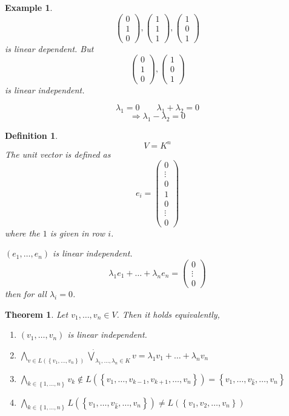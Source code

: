 \documentclass[a4paper,landscape,twocolumn]{article}
\newcommand\set[1]{\left\{#1\right\}}
\newtheorem{theorem}{Theorem}
\newtheorem{defi}{Definition}
\newtheorem{ex}{Example}
\begin{document}
\begin{ex}
  \[ \begin{pmatrix} 0 \\ 1 \\ 0 \end{pmatrix}, \begin{pmatrix} 1 \\ 1 \\ 1 \end{pmatrix}, \begin{pmatrix} 1 \\ 0 \\ 1 \end{pmatrix} \]
  is linear dependent. But
  \[ \begin{pmatrix} 0 \\ 1 \\ 0 \end{pmatrix}, \begin{pmatrix} 1 \\ 0 \\ 1 \end{pmatrix} \]
  is linear independent.

  \[ \lambda_1 = 0 \qquad \lambda_1 + \lambda_2 = 0 \]
  \[ \Rightarrow \lambda_1 - \lambda_2 = 0 \]
\end{ex}

\begin{defi}
  \[ V = K^n \]
  The unit vector is defined as
  \[ e_i = \begin{pmatrix} 0 \\ \vdots \\ 0 \\ 1 \\ 0 \\ \vdots \\ 0 \end{pmatrix} \]
  where the $1$ is given in row $i$.

  $(e_1, \ldots, e_n)$ is linear independent.
  \[ \lambda_1 e_1 + \ldots + \lambda_n e_n = \begin{pmatrix} 0 \\ \vdots \\ 0 \end{pmatrix} \]
  then for all $\lambda_i = 0 $.
\end{defi}

\begin{theorem}
  Let $v_1, \ldots, v_n \in V$. Then it holds equivalently,
  \begin{enumerate}
    \item $(v_1, \ldots, v_n)$ is linear independent.
    \item
        $\bigwedge_{v \in L(\set{v_1, \ldots, v_n})} \dot\bigvee_{\lambda_1, \ldots, \lambda_n \in K} v
        = \lambda_1 v_1 + \ldots + \lambda_n v_n$
    \item $\bigwedge_{k \in \set{1, \ldots, n}} v_k \not\in L(\set{v_1, \ldots, v_{k-1}, v_{k+1}, \ldots, v_n})
        = \set{v_1, \ldots, v_{\hat{k}}, \ldots, v_n}$
    \item $\bigwedge_{k \in \set{1, \ldots, n}} L(\set{v_1, \ldots, v_{\hat k}, \ldots, v_n})
        \neq L(\set{v_1, v_2, \ldots, v_n})$
  \end{enumerate}
\end{theorem}
\end{document}
